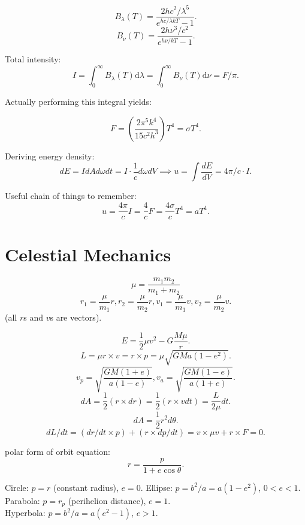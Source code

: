 \documentclass[11pt]{article}
\begin{document}
\[B_{\lambda}(T) = \frac{2hc^2/\lambda^5}{e^{hc/\lambda kT} - 1}.\]
\[B_{\nu}(T) = \frac{2h\nu^3/c^2}{e^{h\nu/kT} - 1}.\]

Total intensity:
\[I = \int_0^{\infty} B_{\lambda}(T)\mathrm{d}\lambda =  \int_0^{\infty} B_{\nu}(T)\mathrm{d}\nu = F/\pi.\]

Actually performing this integral yields:

\[F = \left(\frac{2\pi^5 k^4}{15c^2 h^3}\right)T^4 = \sigma T^4.\]

Deriving energy density:
\[dE = IdAd\omega dt = I\cdot \frac{1}{c}d\omega dV \implies u = \int \frac{dE}{dV} = 4\pi/c \cdot I.\]

Useful chain of things to remember:
\[u = \frac{4\pi}{c}I =  \frac{4}{c}F = \frac{4\sigma}{c}T^4 = aT^4.\]

\section{Celestial Mechanics}

\[\mu = \frac{m_1m_2}{m_1 + m_2}\]
\[r_1 = \frac{\mu}{m_1}r, r_2 = \frac{\mu}{m_2}r, v_1 = \frac{\mu}{m_1}v, v_2 = \frac{\mu}{m_2}v.\]
(all $r$s and $v$s are vectors).

\[E = \frac{1}{2}\mu v^2 - G\frac{M\mu}{r}.\]
\[L = \mu r\times v = r\times p = \mu\sqrt{GMa(1-e^2)}.\]
\[v_p = \sqrt{\frac{GM(1+e)}{a(1-e)}}, v_a = \sqrt{\frac{GM(1-e)}{a(1+e)}}.\]
\[dA = \frac{1}{2}(r\times dr) = \frac{1}{2}(r\times vdt) = \frac{L}{2\mu}dt.\]
\[dA = \frac{1}{2}r^2d\theta.\]
\[dL/dt = (dr/dt\times p) + (r\times dp/dt) = v\times \mu v + r\times F = 0.\]

polar form of orbit equation:
\[r = \frac{p}{1 + e\cos{\theta}}.\]

Circle: $p = r$ (constant radius), $e = 0$. 
Ellipse: $p = b^2/a = a(1-e^2)$, $0 < e < 1$. \\
Parabola: $p = r_p$ (perihelion distance), $e=1$. \\
Hyperbola: $p = b^2/a = a(e^2-1)$, $e > 1$. 
\end{document}
